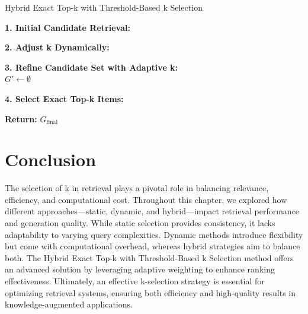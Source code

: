 \begin{algorithm}[H]
	\small
	
	\caption{Hybrid Exact Top-k with Threshold-Based k Selection}
	\label{ALgo1}
	

	\textbf{1. Initial Candidate Retrieval:} \\
	

	\textbf{2. Adjust k Dynamically:} \\
	
	\BlankLine
	\textbf{3. Refine Candidate Set with Adaptive k:} \\
	$G' \gets \emptyset$ \\
	

	\textbf{4. Select Exact Top-k Items:} \\
	

	\textbf{Return:} $G_{\text{final}}$ 
\end{algorithm}
\section{ Conclusion }
The selection of k in retrieval plays a pivotal role in balancing relevance, efficiency, and computational cost. Throughout this chapter, we explored how different approaches—static, dynamic, and hybrid—impact retrieval performance and generation quality. While static selection provides consistency, it lacks adaptability to varying query complexities. Dynamic methods introduce flexibility but come with computational overhead, whereas hybrid strategies aim to balance both. The Hybrid Exact Top-k with Threshold-Based k Selection method offers an advanced solution by leveraging adaptive weighting to enhance ranking effectiveness. Ultimately, an effective k-selection strategy is essential for optimizing retrieval systems, ensuring both efficiency and high-quality results in knowledge-augmented applications.
